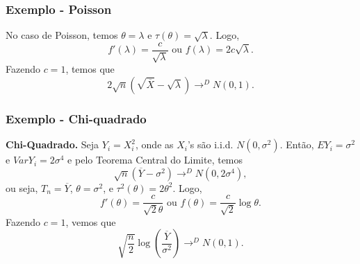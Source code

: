 \begin{frame}
\frametitle{\textbf{Exemplo - Poisson}}


\begin{exem} No caso de Poisson, temos
$\theta=\lambda$ e $\tau(\theta)=\sqrt{\lambda}$. Logo,
$$f'(\lambda)=\frac{c}{\sqrt{\lambda}}\mbox{ ou }f(\lambda)=2c\sqrt{\lambda}.$$
Fazendo $c=1$, temos que
$$2\sqrt{n}(\sqrt{\overline{X}}-\sqrt{\lambda})\rightarrow^D N(0,1).$$
\end{exem}

\end{frame}

\begin{frame}
\frametitle{\textbf{Exemplo - Chi-quadrado}}


\begin{exem} {\bf Chi-Quadrado.} Seja $Y_i=X_i^2$, onde as
$X_i$'s são i.i.d. $N(0,\sigma^2)$. Então, $EY_i=\sigma^2$ e $Var
Y_i=2\sigma^4$ e pelo Teorema Central do Limite, temos
$$\sqrt{n}(\overline{Y}-\sigma^2)\rightarrow^D N(0,2\sigma^4),$$
ou seja, $T_n=\overline{Y}$, $\theta=\sigma^2$, e
$\tau^2(\theta)=2\theta^2$. Logo,
$$f'(\theta)=\frac{c}{\sqrt{2}\theta}\mbox{ ou }f(\theta)=\frac{c}{\sqrt{2}}\log\theta.$$
Fazendo $c=1$, vemos que
$$\sqrt{\frac{n}{2}}\log(\frac{\overline{Y}}{\sigma^2})\rightarrow^D N(0,1).$$
\end{exem}

\end{frame}


